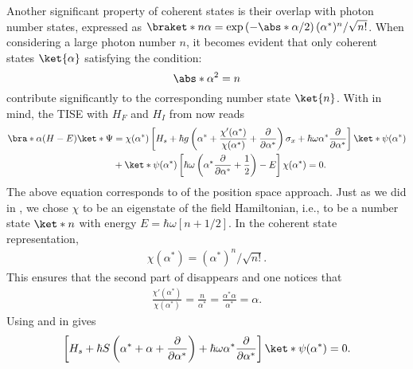 Another significant property of coherent states is their overlap with photon number states, expressed as 
\( \braket*{n}{\alpha} = \exp\left(-\abs*{\alpha}/2\right) (\alpha^*)^n/\sqrt{n!} \). 
When considering a large photon number $n$, it becomes evident that only coherent states 
$\ket{\alpha}$ satisfying the condition:
\begin{equation}
\label{eq:class_jcm_eq22}
\abs*{\alpha}^2 = n
\end{equation}
contribute significantly to the corresponding number state \(\ket{n}\). 
With  in mind, the TISE with $H_F$ and $H_I$ from 
 now reads
\begin{align}
    \label{eq:class_jcm_eq23}
    \bra*{\alpha}(H - E)\ket*{\Psi} &= \chi(\alpha^*)
    \left[H_s + \hbar g \left(\alpha ^* + 
    \frac{\chi'(\alpha^*)}{\chi(\alpha^*)} + \dfrac{\partial}{\partial \alpha^*}
    \right)\sigma_x + \hbar \omega \alpha^* \dfrac{\partial}{\partial \alpha^*}\right] 
    \ket*{\psi(\alpha^*)} \nonumber \\
    &+ \ket*{\psi(\alpha^*)}
    \left[\hbar \omega \left(
        \alpha^* \dfrac{\partial}{\partial \alpha^*} + \frac{1}{2}\right) - E\right]\chi(\alpha^*) = 0. \quad \qquad
\end{align}
The above equation corresponds to  of the position space approach. 
Just as we did in , we chose \(\chi\) to be an eigenstate of the field 
Hamiltonian, i.e., to be a number state \(\ket*{n}\) with energy \(E = \hbar \omega \left[n + 1/2\right]\).
In the coherent state representation, 
\begin{eqnarray}
    \label{eq:class_jcm_eq24}
    \chi(\alpha^*) =  (\alpha^*)^n/\sqrt{n!}. 
\end{eqnarray}
This ensures that the second part of  disappears and one notices that
\begin{eqnarray}
    \label{eq:class_jcm_eq25}   
    \frac{\chi'(\alpha^*)}{\chi(\alpha^*)} = \frac{n}{\alpha^*} = \frac{\alpha^*\alpha}{\alpha^*} = \alpha.
\end{eqnarray}
Using  and  in  gives
\begin{equation}
    \label{eq:class_jcm_eq26}
    \left[H_s + \hbar S \left(\alpha^* + \alpha + 
    \dfrac{\partial}{\partial  \alpha^*}\right) 
    + \hbar \omega \alpha^* \dfrac{\partial}{\partial \alpha^*} \right] \ket*{\psi(\alpha^*)} = 0.
\end{equation}
